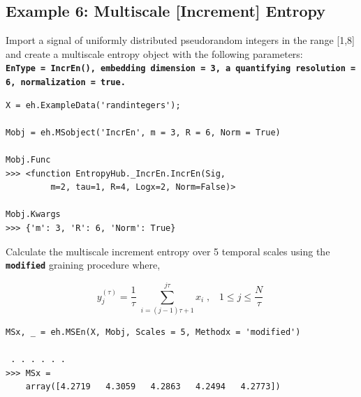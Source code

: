 \documentclass[12pt, a4paper, titlepage, openany]{book}
\begin{document}
\subsection{\normalsize Example 6: \hspace{15mm} Multiscale [Increment] Entropy}
\noindent Import a signal of uniformly distributed pseudorandom integers in the range [1,8] and create a multiscale entropy object with the following parameters:\\
\textbf{\texttt{EnType =  IncrEn(), embedding dimension = 3, a quantifying resolution = 6, normalization = true.}}
\begin{verbatim}
X = eh.ExampleData('randintegers');

Mobj = eh.MSobject('IncrEn', m = 3, R = 6, Norm = True)

Mobj.Func
>>> <function EntropyHub._IncrEn.IncrEn(Sig,
		 m=2, tau=1, R=4, Logx=2, Norm=False)>

Mobj.Kwargs
>>> {'m': 3, 'R': 6, 'Norm': True}
\end{verbatim}    
Calculate the multiscale increment entropy over 5 temporal scales using the \texttt{\textbf{modified}} graining procedure where,
\begin{par}
$$y_j^{\left(\tau \right)} =\frac{1}{\tau }\;\sum_{i=\left(j-1\right)\tau +1}^{j\tau } x_i \;,\;\;\;1\le j\le \frac{N}{\tau }\;$$
\end{par}
\begin{verbatim}
MSx, _ = eh.MSEn(X, Mobj, Scales = 5, Methodx = 'modified')

 . . . . . .
>>> MSx = 
    array([4.2719   4.3059   4.2863   4.2494   4.2773])
\end{verbatim}


\newpage
\end{document}
